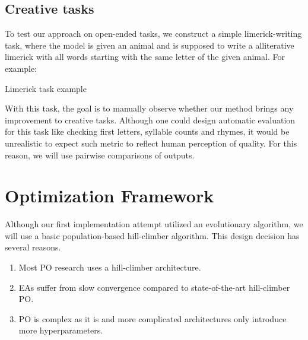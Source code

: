 \subsection{Creative tasks}
To test our approach on open-ended tasks, we construct a simple limerick-writing task, where the model is given an animal and is supposed to write a alliterative limerick
with all words starting with the same letter of the given animal. For example:
\begin{promptbox}[label={box:limerick}]{Limerick task example}
\end{promptbox}
With this task, the goal is to manually observe whether our method brings any improvement to creative tasks.
Although one could design automatic evaluation for this task like checking first letters, syllable counts and rhymes, it would be unrealistic
to expect such metric to reflect human perception of quality. For this reason, we will use pairwise comparisons of outputs.

\section{Optimization Framework}
Although our first implementation attempt utilized an evolutionary algorithm, we will use a basic population-based hill-climber algorithm.
This design decision has several reasons.
\begin{enumerate}
    \item Most PO research uses a hill-climber architecture.
    \item EAs suffer from slow convergence compared to state-of-the-art hill-climber PO\cite{xiang2025selfsupervisedpromptoptimization}.
    \item PO is complex as it is and more complicated architectures only introduce more hyperparameters.
\end{enumerate}


